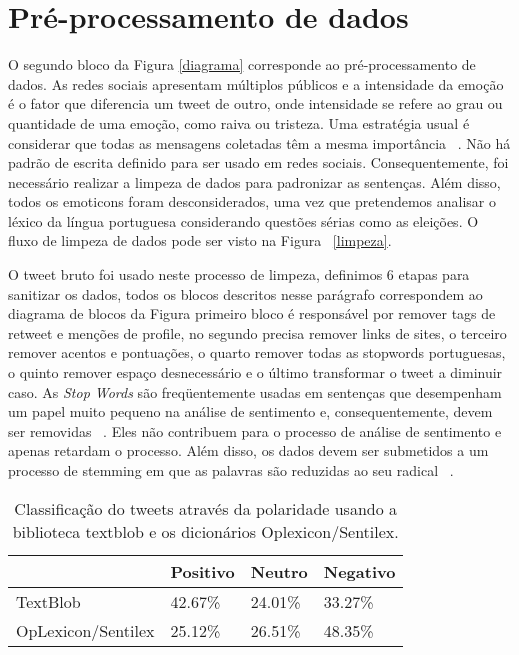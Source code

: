 %


\section{Pré-processamento de dados}

O segundo bloco da Figura \ref{diagrama} corresponde ao pré-processamento
de dados. As redes sociais apresentam múltiplos
públicos e a intensidade da emoção é o fator que diferencia um tweet de outro, onde intensidade se refere ao
grau ou quantidade de uma emoção, como raiva ou tristeza.
Uma estratégia usual é considerar que todas as mensagens
coletadas têm a mesma importância ~\cite{de2015estrategia}.
Não há padrão de escrita definido para ser usado em redes
sociais. Consequentemente, foi necessário realizar a limpeza
de dados para padronizar as sentenças. Além disso, todos os
emoticons foram desconsiderados, uma vez que pretendemos
analisar o léxico da língua portuguesa considerando questões
sérias como as eleições. O fluxo de limpeza de dados pode
ser visto na Figura ~\ref{limpeza}.




O tweet bruto foi usado neste processo de limpeza, definimos
6 etapas para sanitizar os dados, todos os blocos
descritos nesse parágrafo correspondem ao diagrama de blocos
da Figura  primeiro bloco é responsável por remover tags de
retweet e menções de profile, no segundo precisa remover links
de sites, o terceiro remover acentos e pontuações, o quarto
remover todas as stopwords portuguesas, o quinto remover
espaço desnecessário e o último transformar o tweet a diminuir
caso.
As \textit{Stop Words} são freqüentemente usadas em sentenças
que desempenham um papel muito pequeno na análise de sentimento e, consequentemente, devem ser removidas ~\cite{sharma}.
Eles não contribuem para o processo de análise de sentimento
e apenas retardam o processo. Além disso, os dados devem ser
submetidos a um processo de stemming em que as palavras
são reduzidas ao seu radical ~\cite{de2015estrategia}.




    \begin{table}
        \label{table1}
        \centering
        \caption{Classificação do tweets através da polaridade usando a
        biblioteca textblob e os dicionários Oplexicon/Sentilex.}
       
        \begin{tabular}{llll}
        \hline
                  & Positivo & Neutro & Negativo \\ \hline
        TextBlob  & 42.67\%  & 24.01\% & 33.27\%  \\ \hline
        OpLexicon/Sentilex & 25.12\%  & 26.51\% & 48.35\%  \\ \hline
        \end{tabular}
    \end{table}



